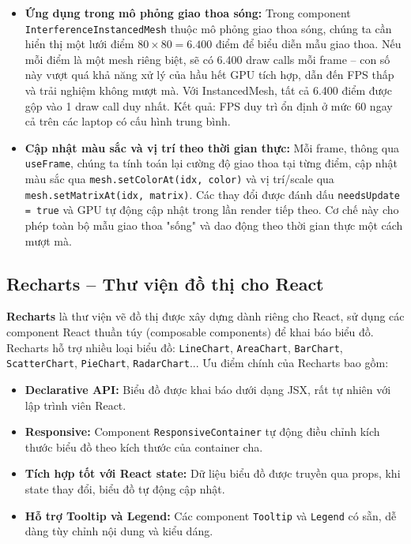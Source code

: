\begin{itemize}
    \item \textbf{Ứng dụng trong mô phỏng giao thoa sóng:} Trong component \texttt{InterferenceInstancedMesh} thuộc mô phỏng giao thoa sóng, chúng ta cần hiển thị một lưới điểm $80 \times 80 = 6.400$ điểm để biểu diễn mẫu giao thoa. Nếu mỗi điểm là một mesh riêng biệt, sẽ có 6.400 draw calls mỗi frame – con số này vượt quá khả năng xử lý của hầu hết GPU tích hợp, dẫn đến FPS thấp và trải nghiệm không mượt mà. Với InstancedMesh, tất cả 6.400 điểm được gộp vào 1 draw call duy nhất. Kết quả: FPS duy trì ổn định ở mức 60 ngay cả trên các laptop có cấu hình trung bình.
    \item \textbf{Cập nhật màu sắc và vị trí theo thời gian thực:} Mỗi frame, thông qua \texttt{useFrame}, chúng ta tính toán lại cường độ giao thoa tại từng điểm, cập nhật màu sắc qua \texttt{mesh.setColorAt(idx, color)} và vị trí/scale qua \texttt{mesh.setMatrixAt(idx, matrix)}. Các thay đổi được đánh dấu \texttt{needsUpdate = true} và GPU tự động cập nhật trong lần render tiếp theo. Cơ chế này cho phép toàn bộ mẫu giao thoa "sống" và dao động theo thời gian thực một cách mượt mà.
\end{itemize}

\subsection{Recharts – Thư viện đồ thị cho React}

\textbf{Recharts} là thư viện vẽ đồ thị được xây dựng dành riêng cho React, sử dụng các component React thuần túy (composable components) để khai báo biểu đồ. Recharts hỗ trợ nhiều loại biểu đồ: \texttt{LineChart}, \texttt{AreaChart}, \texttt{BarChart}, \texttt{ScatterChart}, \texttt{PieChart}, \texttt{RadarChart}... Ưu điểm chính của Recharts bao gồm:

\begin{itemize}
    \item \textbf{Declarative API:} Biểu đồ được khai báo dưới dạng JSX, rất tự nhiên với lập trình viên React.
    \item \textbf{Responsive:} Component \texttt{ResponsiveContainer} tự động điều chỉnh kích thước biểu đồ theo kích thước của container cha.
    \item \textbf{Tích hợp tốt với React state:} Dữ liệu biểu đồ được truyền qua props, khi state thay đổi, biểu đồ tự động cập nhật.
    \item \textbf{Hỗ trợ Tooltip và Legend:} Các component \texttt{Tooltip} và \texttt{Legend} có sẵn, dễ dàng tùy chỉnh nội dung và kiểu dáng.
\end{itemize}


